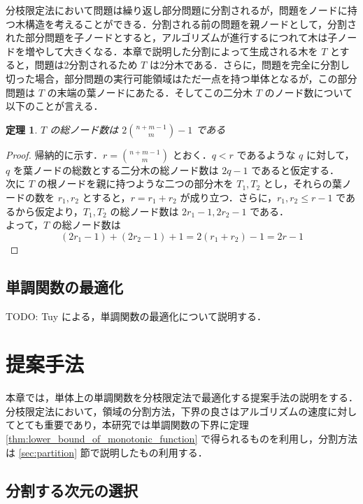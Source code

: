 \documentclass[a4paper,11pt]{jreport}
\newtheorem{theorem}{定理}
\begin{document}
分枝限定法において問題は繰り返し部分問題に分割されるが，問題をノードに持つ木構造を考えることができる．分割される前の問題を親ノードとして，分割された部分問題を子ノードとすると，アルゴリズムが進行するにつれて木は子ノードを増やして大きくなる．本章で説明した分割によって生成される木を $ T $ とすると，問題は2分割されるため $ T $ は2分木である．さらに，問題を完全に分割し切った場合，部分問題の実行可能領域はただ一点を持つ単体となるが，この部分問題は $ T $ の末端の葉ノードにあたる．そしてこの二分木 $ T $ のノード数について以下のことが言える．

\begin{theorem}
$ T $ の総ノード数は $ 2 \binom{n + m - 1}{m} - 1 $ である
\end{theorem}
\begin{proof}
帰納的に示す．$ r = \binom{n + m - 1}{m} $ とおく．$ q < r $ であるような $ q $ に対して，$ q $ を葉ノードの総数とする二分木の総ノード数は $ 2q - 1 $ であると仮定する．\\
次に $ T $ の根ノードを親に持つような二つの部分木を $ T_1, T_2 $ とし，それらの葉ノードの数を $ r_1, r_2 $ とすると，$ r = r_1 + r_2 $ が成り立つ．さらに，$ r_1, r_2 \leq r - 1 $ であるから仮定より，$ T_1, T_2 $ の総ノード数は $ 2r_1 - 1, 2r_2 - 1 $ である．\\
よって，$ T $ の総ノード数は
$$ (2r_1 - 1) + (2r_2 - 1) + 1 = 2(r_1 + r_2) - 1 = 2r - 1 $$
\end{proof}

\section{単調関数の最適化}

TODO: Tuy による，単調関数の最適化について説明する．\par

\chapter{提案手法}

本章では，単体上の単調関数を分枝限定法で最適化する提案手法の説明をする．分枝限定法において，領域の分割方法，下界の良さはアルゴリズムの速度に対してとても重要であり，本研究では単調関数の下界に定理  \ref{thm:lower_bound_of_monotonic_function} で得られるものを利用し，分割方法は \ref{sec:partition} 節で説明したもの利用する．\par

\section{分割する次元の選択}
\end{document}
